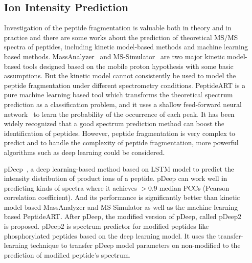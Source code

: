 \subsection{Ion Intensity Prediction}
Investigation of the peptide fragmentation is valuable both in theory and in practice and there are some works about the prediction of theoretical MS/MS spectra of peptides, including kinetic model-based methods and machine learning based methods. MassAnalyzer~\cite{zhang2004prediction, zhang2005prediction} and MS-Simulator~\cite{sun2012ms,wang2015openms} are two major kinetic model-based tools designed based on the mobile proton hypothesis with some basic assumptions. But the kinetic model cannot consistently be used to model the peptide fragmentation under different spectrometry conditions. 
PeptideART is a pure machine learning based tool which transforms the theoretical spectrum prediction as a classification problem, and it uses a shallow feed-forward neural network~\cite{arnold2006machine,li2011accuracy} to learn the probability of the occurrence of each peak.
It has been widely recognized that a good spectrum prediction method can boost the identification of peptides. However, peptide fragmentation is very complex to predict and to handle the complexity of peptide fragmentation, more powerful algorithms such as deep learning could be considered.

pDeep~\cite{zhou2017pdeep}, a deep learning-based method based on LSTM model to predict the intensity distribution of product ions of a peptide. pDeep can
work well in predicting kinds of spectra where it achieves $>$0.9 median PCCs (Pearson correlation coefficient). And its performance is significantly better than kinetic model-based MassAnalyzer and MS-Simulator as well as the machine learning-based PeptideART. After pDeep, the modified version of pDeep, called pDeep2~\cite{zeng2019ms} is proposed. pDeep2 is spectrum predictor for modified peptides like phosphorylated peptides based on the deep learning model. It uses the transfer-learning technique to transfer pDeep model parameters on non-modified to the prediction of modified peptide's spectrum.